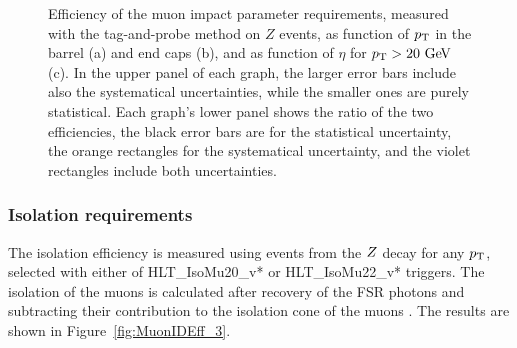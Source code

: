 \begin{figure}[tbh]
\begin{subfigure}{0.3\textwidth}
\caption{}
\end{subfigure}
\caption{Efficiency of the muon impact parameter requirements, measured with the tag-and-probe method on $Z$ events, as function of $p_{\rm{T}}$ in the barrel (a) and end caps (b), and as function of $\eta$ for $p_{\rm{T}} > 20\ \mathrm{Ge\kern -0.1em V}$ (c). In the upper panel of each graph, the larger error bars include also the systematical uncertainties, while the smaller ones are purely statistical. Each graph's lower panel shows the ratio of the two efficiencies, the black error bars are for the statistical uncertainty, the orange rectangles for the systematical uncertainty, and the violet rectangles include both uncertainties.}
\label{fig:MuonIDEff_2}
\end{figure}


\subsubsection{Isolation requirements}
The isolation efficiency is measured using events from the $Z$ decay for any $p_{\rm{T}}$, selected with either of HLT\_IsoMu20\_v* or HLT\_IsoMu22\_v* triggers. The isolation of the muons is calculated after recovery of the FSR photons and subtracting their contribution to the isolation cone of the muons \cite{AN-16-217}.
The results are shown in Figure~\ref{fig:MuonIDEff_3}.

